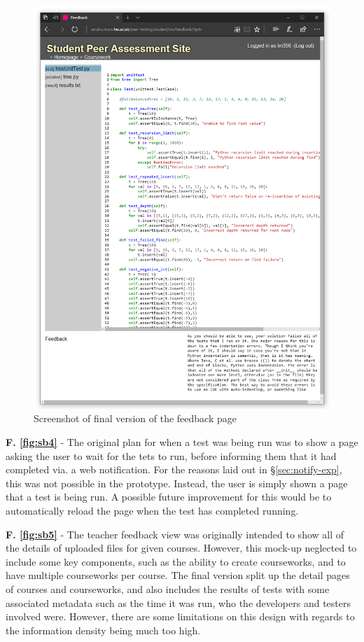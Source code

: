 \documentclass[a4paper,11pt]{report}
\begin{document}
\begin{figure}
\centering
\includegraphics[width=\textwidth]{storyboard/final-feedback.png}
\caption{\label{fig:final-fb}Screenshot of final version of the feedback page}
\end{figure}
\textbf{F. \ref{fig:sb4}} - The original plan for when a test was being run was to show a page asking the user to wait for the tets to run, before informing them that it had completed via. a web notification. For the reasons laid out in \S \ref{sec:notify-exp}, this was not possible in the prototype. Instead, the user is simply shown a page that a test is being run. A possible future improvement for this would be to automatically reload the page when the test has completed running.\par
\textbf{F. \ref{fig:sb5}} - The teacher feedback view was originally intended to show all of the details of uploaded files for given courses. However, this mock-up neglected to include some key components, such as the ability to create courseworks, and to have multiple courseworks per course. The final version split up the detail pages of courses and courseworks, and also includes the results of tests with some associated metadata such as the time it was run, who the developers and testers involved were. However, there are some limitations on this design with regards to the information density being much too high.\par
\end{document}
